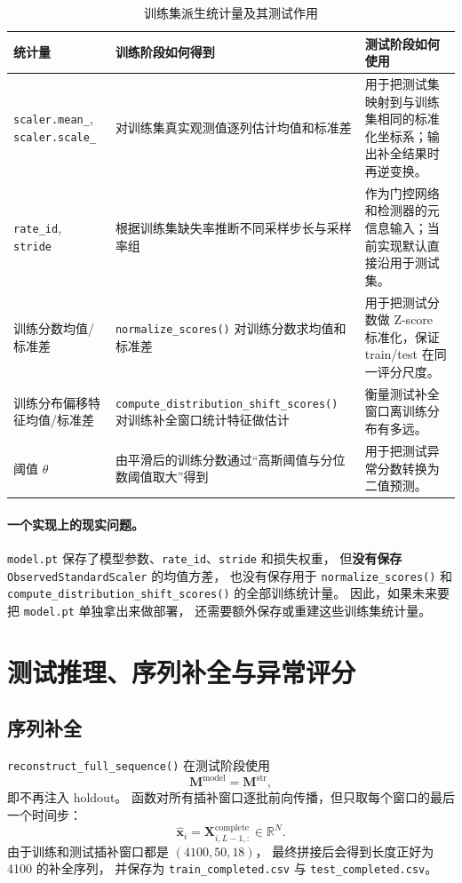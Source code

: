 \documentclass[UTF8,11pt,a4paper]{ctexart}
\begin{document}
\begin{table}[H]
\centering
\caption{训练集派生统计量及其测试作用}
\begin{tabularx}{\textwidth}{@{}l Y Y@{}}
\toprule
统计量 & 训练阶段如何得到 & 测试阶段如何使用 \\
\midrule
\texttt{scaler.mean\_}, \texttt{scaler.scale\_} &
对训练集真实观测值逐列估计均值和标准差 &
用于把测试集映射到与训练集相同的标准化坐标系；输出补全结果时再逆变换。 \\
\texttt{rate\_id}, \texttt{stride} &
根据训练集缺失率推断不同采样步长与采样率组 &
作为门控网络和检测器的元信息输入；当前实现默认直接沿用于测试集。 \\
训练分数均值/标准差 &
\texttt{normalize\_scores()} 对训练分数求均值和标准差 &
用于把测试分数做 Z-score 标准化，保证 train/test 在同一评分尺度。 \\
训练分布偏移特征均值/标准差 &
\texttt{compute\_distribution\_shift\_scores()} 对训练补全窗口统计特征做估计 &
衡量测试补全窗口离训练分布有多远。 \\
阈值 $\theta$ &
由平滑后的训练分数通过“高斯阈值与分位数阈值取大”得到 &
用于把测试异常分数转换为二值预测。 \\
\bottomrule
\end{tabularx}
\end{table}

\paragraph{一个实现上的现实问题。}
\texttt{model.pt} 保存了模型参数、\texttt{rate\_id}、\texttt{stride} 和损失权重，
但\textbf{没有保存} \texttt{ObservedStandardScaler} 的均值方差，
也没有保存用于 \texttt{normalize\_scores()} 和
\texttt{compute\_distribution\_shift\_scores()} 的全部训练统计量。
因此，如果未来要把 \texttt{model.pt} 单独拿出来做部署，
还需要额外保存或重建这些训练集统计量。

\section{测试推理、序列补全与异常评分}

\subsection{序列补全}

\texttt{reconstruct\_full\_sequence()} 在测试阶段使用
\[
\bm{M}^{\mathrm{model}}=\bm{M}^{\mathrm{str}},
\]
即不再注入 holdout。
函数对所有插补窗口逐批前向传播，但只取每个窗口的最后一个时间步：
\[
\hat{\bm{x}}_i
=
\bm{X}^{\mathrm{complete}}_{i,L-1,:}\in\mathbb{R}^{N}.
\]
由于训练和测试插补窗口都是 $(4100,50,18)$，
最终拼接后会得到长度正好为 4100 的补全序列，
并保存为 \texttt{train\_completed.csv} 与 \texttt{test\_completed.csv}。
\end{document}
